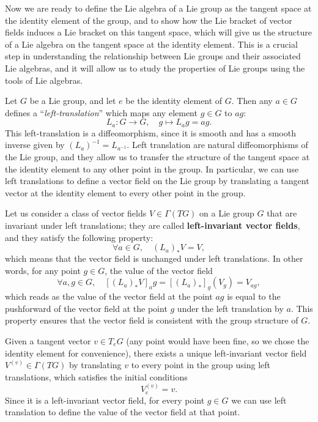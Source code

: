 Now we are ready to define the Lie algebra of a Lie group as the tangent space at the identity element of the group, and to show how the Lie bracket of vector fields induces a Lie bracket on this tangent space, which will give us the structure of a Lie algebra on the tangent space at the identity element. This is a crucial step in understanding the relationship between Lie groups and their associated Lie algebras, and it will allow us to study the properties of Lie groups using the tools of Lie algebras.

\begin{definition}
    Let \(G\) be a Lie group, and let \(e\) be the identity element of \(G\). Then any \(a \in G\) defines a ``\textit{left-translation}'' which maps any element \(g \in G\) to \(ag\):
    \[
        L_a : G \to G, \quad g \mapsto L_a g = ag.
    \]
    This left-translation is a diffeomorphism, since it is smooth and has a smooth inverse given by \((L_{a})^{-1} = L_{a^{-1}}\). Left translation are natural diffeomorphisms of the Lie group, and they allow us to transfer the structure of the tangent space at the identity element to any other point in the group. In particular, we can use left translations to define a vector field on the Lie group by translating a tangent vector at the identity element to every other point in the group.
\end{definition}

\begin{definition}
    Let us consider a class of vector fields \(V \in \Gamma(TG)\) on a Lie group \(G\) that are invariant under left translations; they are called \textbf{left-invariant vector fields}, and they satisfy the following property:
    \[
        \forall a \in G, \quad (L_a)_* V = V,
    \]
    which means that the vector field is unchanged under left translations. In other words, for any point \(g \in G\), the value of the vector field
    \[
        \forall a,g \in G, \quad [(L_a)_* V]_ag = [(L_a)_*]_g (V_g) = V_{ag},
    \]
    which reads as the value of the vector field at the point \(ag\) is equal to the pushforward of the vector field at the point \(g\) under the left translation by \(a\). This property ensures that the vector field is consistent with the group structure of \(G\).
\end{definition}

\begin{lemma}
    Given a tangent vector \(v \in T_e G\) (any point would have been fine, so we chose the identity element for convenience), there exists a unique left-invariant vector field \(V^{(v)} \in \Gamma(TG)\) by translating \(v\) to every point in the group using left translations, which satisfies the initial conditions
    \[
        V^{(v)}_e = v.
    \]
    Since it is a left-invariant vector field, for every point \(g \in G\) we can use left translation to define the value of the vector field at that point.
\end{lemma}


